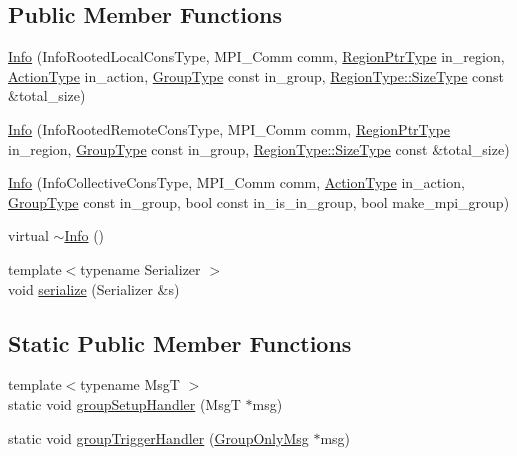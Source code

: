 \subsection*{Public Member Functions}
\begin{DoxyCompactItemize}
\item 
\hyperlink{structvt_1_1group_1_1_info_afe28218871a3b83a304bff5e72055eae}{Info} (Info\+Rooted\+Local\+Cons\+Type, M\+P\+I\+\_\+\+Comm comm, \hyperlink{structvt_1_1group_1_1_info_rooted_a127ac5ebcfb9871621c1f66dba481c0b}{Region\+Ptr\+Type} in\+\_\+region, \hyperlink{namespacevt_ae0a5a7b18cc99d7b732cb4d44f46b0f3}{Action\+Type} in\+\_\+action, \hyperlink{namespacevt_a27b5e4411c9b6140c49100e050e2f743}{Group\+Type} const in\+\_\+group, \hyperlink{structvt_1_1group_1_1region_1_1_region_a9bb381adf31111aae34dbc644bad6c1f}{Region\+Type\+::\+Size\+Type} const \&total\+\_\+size)
\item 
\hyperlink{structvt_1_1group_1_1_info_aadcf55179338b7921de5c1a6856a1d42}{Info} (Info\+Rooted\+Remote\+Cons\+Type, M\+P\+I\+\_\+\+Comm comm, \hyperlink{structvt_1_1group_1_1_info_rooted_a127ac5ebcfb9871621c1f66dba481c0b}{Region\+Ptr\+Type} in\+\_\+region, \hyperlink{namespacevt_a27b5e4411c9b6140c49100e050e2f743}{Group\+Type} const in\+\_\+group, \hyperlink{structvt_1_1group_1_1region_1_1_region_a9bb381adf31111aae34dbc644bad6c1f}{Region\+Type\+::\+Size\+Type} const \&total\+\_\+size)
\item 
\hyperlink{structvt_1_1group_1_1_info_a76c4cf6ec9e88e8f79aa0fe90af82289}{Info} (Info\+Collective\+Cons\+Type, M\+P\+I\+\_\+\+Comm comm, \hyperlink{namespacevt_ae0a5a7b18cc99d7b732cb4d44f46b0f3}{Action\+Type} in\+\_\+action, \hyperlink{namespacevt_a27b5e4411c9b6140c49100e050e2f743}{Group\+Type} const in\+\_\+group, bool const in\+\_\+is\+\_\+in\+\_\+group, bool make\+\_\+mpi\+\_\+group)
\item 
virtual \hyperlink{structvt_1_1group_1_1_info_a04f1febedc844247ef36c17146f5ccfc}{$\sim$\+Info} ()
\item 
{\footnotesize template$<$typename Serializer $>$ }\\void \hyperlink{structvt_1_1group_1_1_info_a4b86c5c60fba4b1f4f7d067873e16f22}{serialize} (Serializer \&s)
\end{DoxyCompactItemize}
\subsection*{Static Public Member Functions}
\begin{DoxyCompactItemize}
\item 
{\footnotesize template$<$typename MsgT $>$ }\\static void \hyperlink{structvt_1_1group_1_1_info_a8479ae53fed60033acca267e0918aa6f}{group\+Setup\+Handler} (MsgT $\ast$msg)
\item 
static void \hyperlink{structvt_1_1group_1_1_info_a4b457782f9b23a2ad6df129d6c4b1502}{group\+Trigger\+Handler} (\hyperlink{namespacevt_1_1group_a864fcf6bc821eacf8350bf4ad15e51b3}{Group\+Only\+Msg} $\ast$msg)
\end{DoxyCompactItemize}
